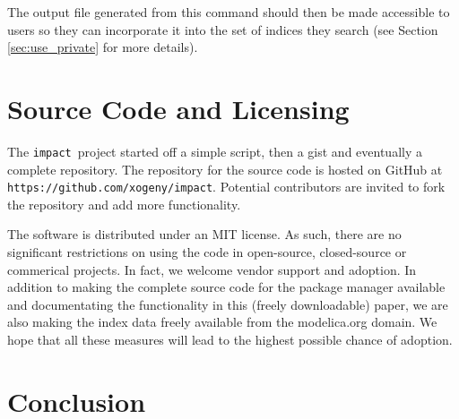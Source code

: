 \documentclass[11pt,a4paper,twocolumn]{article}
\newcommand{\impact}{\texttt{impact}} %
\newcommand{\code}[1]{\texttt{#1}} %
\begin{document}
The output file generated from this command should then be made accessible
to users so they can incorporate it into the set of indices they search
(see Section \ref{sec:use_private} for more details).

\section{Source Code and Licensing}
\label{sec:source}

The \impact\ project started off a simple script, then a gist and eventually a 
complete repository.  The repository for the source code is hosted on GitHub at
\code{https://github.com/xogeny/impact}.  Potential contributors are invited to 
fork the repository and add more functionality.

The software is distributed under an MIT license.  As such, there are no 
significant restrictions on using the code in open-source, closed-source or 
commerical projects.
In fact, we welcome vendor support and adoption.  In addition to making the 
complete source code for the package manager available and documentating the 
functionality in this (freely downloadable) paper, we are also making the index 
data freely available from the modelica.org domain.   We hope that all these 
measures will lead to the highest possible chance of adoption.

\section{Conclusion}
\label{sec:conclusion}







\end{document}
